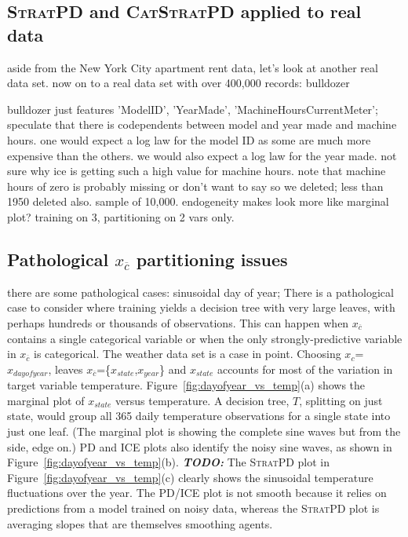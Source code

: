 \documentclass[12pt]{article}
\newcommand{\figref}[1]{Figure~\ref{#1}}
\newcommand{\todo}[1]{{\bf\em TODO:} {{\color{red}{#1}}}}
\newcommand{\spd}{\fontfamily{cmr}\textsc{\small StratPD}}
\newcommand{\cspd}{\fontfamily{cmr}\textsc{\small CatStratPD}}
\newcommand{\xnc}{$x_{\overline{c}}$}
\begin{document}
\subsection{\spd{} and \cspd{} applied to real data} 

aside from the New York City apartment rent data, let's look at another real data set. now on to a real data set with over 400,000 records: bulldozer

bulldozer  just features 'ModelID', 'YearMade', 'MachineHoursCurrentMeter'; speculate that there is codependents between model and year made and machine hours. one would expect a log law for the model ID as some are much more expensive than the others. we would also expect a log law for the year made. not sure why ice is getting such a high value for machine hours.  note that machine hours of zero is probably missing or don't want to say so we deleted; less than 1950 deleted also.  sample of 10,000. endogeneity makes look more like marginal plot? training on 3, partitioning on 2 vars only.

\subsection{Pathological \xnc{} partitioning issues}

there are some pathological cases: sinusoidal day of year; There is a pathological case to consider where training yields a decision tree with very large leaves, with perhaps hundreds or thousands of observations.  This can happen when \xnc{} contains a single categorical variable or when the only strongly-predictive variable in \xnc{} is categorical.  The weather data set is a case in point. Choosing $x_c$=$x_{dayofyear}$, leaves \xnc{}=\{$x_{state}$,$x_{year}$\} and $x_{state}$ accounts for most of the variation in target variable temperature.  \figref{fig:dayofyear_vs_temp}(a) shows the marginal plot of $x_{state}$ versus temperature. A decision tree, $T$, splitting on just state, would group all 365 daily temperature observations for a single state into just one leaf. (The marginal plot is showing the complete sine waves but from the side, edge on.)   PD and ICE plots also identify the noisy sine waves, as shown in \figref{fig:dayofyear_vs_temp}(b). \todo{uses random forest with how many trees for pd/ice?} The \spd{} plot in \figref{fig:dayofyear_vs_temp}(c) clearly shows the sinusoidal temperature fluctuations over the year. The PD/ICE plot is not smooth because it relies on predictions from a model trained on noisy data, whereas the \spd{} plot is averaging slopes that are themselves smoothing agents.
\end{document}
